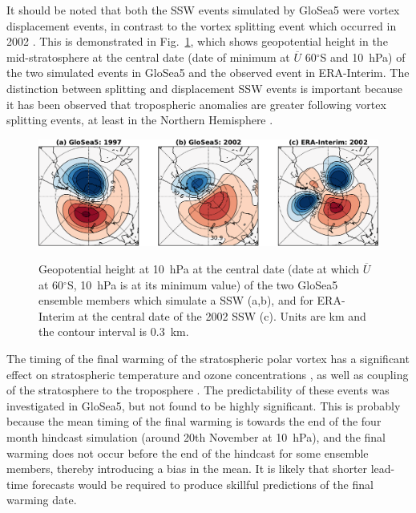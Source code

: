 It should be noted that both the SSW events simulated by GloSea5 were vortex
displacement events, in contrast to the vortex splitting event which occurred in
2002 \citep{Charlton2005a}. This is demonstrated in Fig.\ \ref{fig:sh_ssws}, which
shows geopotential height in the mid-stratosphere at the central date (date of
minimum at $\overline{U}$ 60$^{\circ}$S and 10~hPa) of the two simulated events
in GloSea5 and the observed event in ERA-Interim. The distinction between
splitting and displacement SSW events is important because it has been observed
that tropospheric anomalies are greater following vortex splitting events, at
least in the Northern Hemisphere \citep{Nakagawa2006, Mitchell2013}.

\begin{figure}[t]
  \noindent\includegraphics[width=\textwidth,angle=0]{figures/chapter-seasonal/ssws_crop.pdf}\\
  \caption[Comparison of GloSea5 and observed SSWs.]{Geopotential height at
10~hPa at the central date (date at which $\overline{U}$ at 60$^{\circ}$S,
10~hPa is at its minimum value) of the two GloSea5 ensemble members which
simulate a SSW (a,b), and for ERA-Interim at the central date of the 2002 SSW
(c). Units are km and the contour interval is 0.3~km.}\label{fig:sh_ssws}
\end{figure}


The timing of the final warming of the stratospheric polar vortex has a
significant effect on stratospheric temperature and ozone concentrations
\citep{Yamazaki1987}, as well as coupling of the stratosphere to the troposphere
\citep{Black2007}. The predictability of these events was investigated in
GloSea5, but not found to be highly significant. This is probably because the
mean timing of the final warming is towards the end of the four month hindcast
simulation (around 20th November at 10~hPa), and the final warming does not
occur before the end of the hindcast for some ensemble members, thereby
introducing a bias in the mean. It is likely that shorter lead-time forecasts
would be required to produce skillful predictions of the final warming date.


